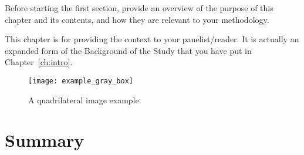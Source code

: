 Before starting the first section, provide an overview of the purpose of this chapter and its contents, and how they are relevant to your methodology.

This chapter is for providing the context to your panelist/reader.  It is actually an expanded form of the Background of the Study that you have put in Chapter~\ref{ch:intro}.

\textcolor[rgb]{0.75,0.75,0.75}{\Blindtext}

\begin{figure}[!htbp]
	\centering
		\texttt{[image: example\_gray\_box]}
	\caption{A quadrilateral image example.}
	\label{fig:exampletc}
\end{figure}

\section{Summary}